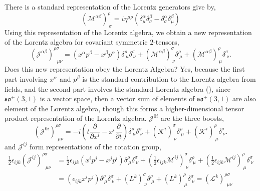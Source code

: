 There is a standard representation of the Lorentz generators give by, 
\begin{equation}\label{lorentz-lie-algebra-standard}
    \left(\mathcal{M}^{\alpha\beta}\right)^{\rho}_{\ \sigma} = i\eta^{\mu\rho}\left(\delta^{\alpha}_{\mu}\delta^{\beta}_{\sigma} -\delta^{\alpha}_{\sigma}\delta^{\beta}_{\mu}\right)
\end{equation}
Using this representation of the Lorentz algebra, we obtain a new representation of the Lorentz algebra for covariant symmetric $2$-tensors,  
\begin{equation}
    \left(\mathcal{J}^{\alpha\beta}\right)^{\rho\sigma}_{\ \ \ \mu\nu} = \left(x^{\alpha}p^{\beta} - x^{\beta}p^{\alpha}\right)\delta^{\rho}_{\ \mu}\delta^{\sigma}_{\ \nu} + \left(\mathcal{M}^{\alpha\beta}\right)^{\sigma}_{\ \nu}\delta^{\rho}_{\ \mu} + \left(\mathcal{M}^{\alpha\beta}\right)^{\rho}_{\ \mu}\delta^{\sigma}_{\ \nu}.
\end{equation}
Does this new representation obey the Lorentz Algebra? Yes, because the first part involving $x^{\alpha}$ and $p^{\beta}$ is the standard contribution to the Lorentz algebra from fields, and the second part involves the standard Lorentz algebra (\cite{lorentz-lie-algebra-standard}), since $\mathfrak{so}^+(3,1)$ is a vector space, then a vector sum of elements of $\mathfrak{so}^+(3,1)$ are also element of the Lorentz algebra, though this forms a higher-dimensional tensor product representation of the Lorentz algebra. $\mathcal{J}^{0i}$ are the three boosts, 
\begin{equation}
    \left(\mathcal{J}^{0i}\right)^{\rho\sigma}_{\ \ \mu\nu} = -i\left(t\frac{\partial}{\partial x^i}-x^i\frac{\partial}{\partial t}\right)\delta^{\rho}_{\ \mu}\delta^{\sigma}_{\ \nu} + \left(\mathcal{K}^i\right)^{\sigma}_{\ \nu}\delta^{\rho}_{\ \mu} + \left(\mathcal{K}^i\right)^{\rho}_{\ \mu}\delta^{\sigma}_{\ \nu}.
\end{equation}
and $\mathcal{J}^{ij}$ form representations of the rotation group, 
\begin{equation}
\begin{split}
    \frac{1}{2}\epsilon_{ijk}\left(\mathcal{J}^{ij}\right)^{\rho\sigma}_{\ \ \ \mu\nu} &= \frac{1}{2}\epsilon_{ijk}\left(x^ip^j - x^jp^i\right)\delta^{\rho}_{\ \mu}\delta^{\sigma}_{\ \nu} + \left(\frac{1}{2}\epsilon_{ijk}\mathcal{M}^{ij}\right)^{\sigma}_{\ \nu}\delta^{\rho}_{\ \mu} + \left(\frac{1}{2}\epsilon_{ijk}\mathcal{M}^{ij}\right)^{\rho}_{\ \mu}\delta^{\sigma}_{\ \nu}\\
    &= (\epsilon_{ijk}x^ip^j)\delta^{\rho}_{\ \mu}\delta^{\sigma}_{\ \nu} + \left(L^k\right)^{\sigma}_{\ \nu}\delta^{\rho}_{\ \mu} + \left(L^k\right)^{\rho}_{\ \mu}\delta^{\sigma}_{\ \nu} = \left(\mathcal{L}^k\right)^{\rho\sigma}_{\ \ \mu\nu}
\end{split}
\end{equation}
